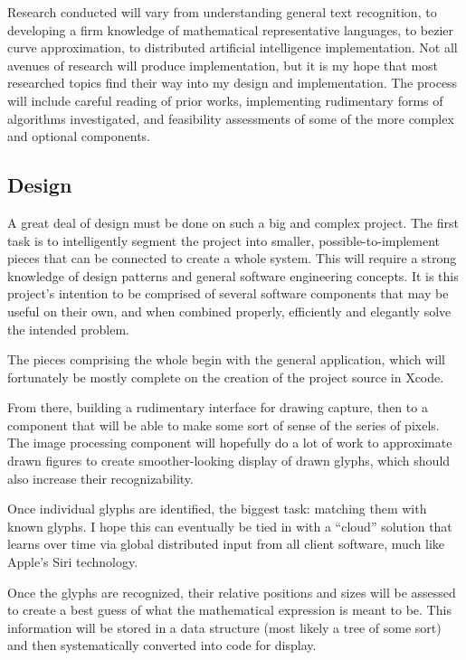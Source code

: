 \documentclass{acm_proc_article-sp}
\begin{document}
Research conducted will vary from understanding general text recognition, to developing a firm knowledge of mathematical representative languages, to bezier curve approximation, to distributed artificial intelligence implementation. Not all avenues of research will produce implementation, but it is my hope that most researched topics find their way into my design and implementation. The process will include careful reading of prior works, implementing rudimentary forms of algorithms investigated, and feasibility assessments of some of the more complex and optional components.

\subsection{Design}
A great deal of design must be done on such a big and complex project. The first task is to intelligently segment the project into smaller, possible-to-implement pieces that can be connected to create a whole system. This will require a strong knowledge of design patterns and general software engineering concepts. It is this project's intention to be comprised of several software components that may be useful on their own, and when combined properly, efficiently and elegantly solve the intended problem. 

The pieces comprising the whole begin with the general application, which will fortunately be mostly complete on the creation of the project source in Xcode. 

From there, building a rudimentary interface for drawing capture, then to a component that will be able to make some sort of sense of the series of pixels. The image processing component will hopefully do a lot of work to approximate drawn figures to create smoother-looking display of drawn glyphs, which should also increase their recognizability. 

Once individual glyphs are identified, the biggest task: matching them with known glyphs. I hope this can eventually be tied in with a ``cloud'' solution that learns over time via global distributed input from all client software, much like Apple's Siri technology. 

Once the glyphs are recognized, their relative positions and sizes will  be assessed to create a best guess of what the mathematical expression is meant to be. This information will be stored in a data structure (most likely a tree of some sort) and then systematically converted into code for display.
\end{document}
